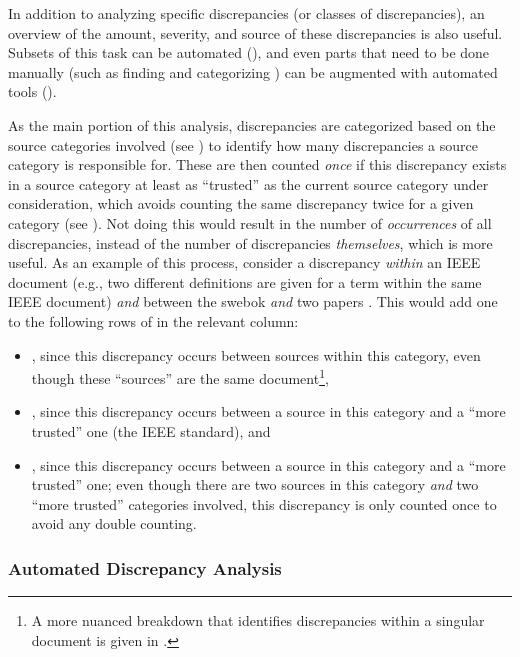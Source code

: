 In addition to analyzing specific discrepancies (or classes of discrepancies),
an overview of the amount, severity, and source of these discrepancies is also
useful. Subsets of this task can be automated (),
and even parts that need to be done manually (such as finding and categorizing
) can be augmented with automated
tools ().

As the main portion of this analysis, discrepancies are categorized
based on the source categories involved (see ) to identify how
many discrepancies a source category is responsible for. These
are then counted \emph{once} if this discrepancy exists in a source category at
least as ``trusted'' as the current source category under consideration, which
avoids counting the same discrepancy twice for a given category (see
). Not doing this would result in the number of
\emph{occurrences} of all discrepancies, instead of the number of discrepancies
\emph{themselves}, which is more useful.
As an example of this process, consider a discrepancy \emph{within} an IEEE
document (e.g., two different definitions are given for a term within the same
IEEE document) \emph{and} between the \acs{swebok} \emph{and} two papers%
. This would add one to the following rows of
 in the relevant column:

\begin{itemize}
    \item \textbf{}, since this discrepancy occurs between
          sources within this category, even though these ``sources'' are the
          same document\footnote{A more nuanced breakdown that identifies
              discrepancies within a singular document is given in
              .},
    \item \textbf{}, since this discrepancy occurs between a
          source in this category and a ``more trusted'' one
          (the IEEE standard), and
    \item \textbf{}, since this discrepancy occurs between a
          source in this category and a ``more trusted'' one; even though there
          are two sources in this category \emph{and} two ``more trusted''
          categories involved, this discrepancy is only counted once to avoid
          any double counting.
\end{itemize}

\subsubsection{Automated Discrepancy Analysis}
\label{auto-discrep-analysis}

